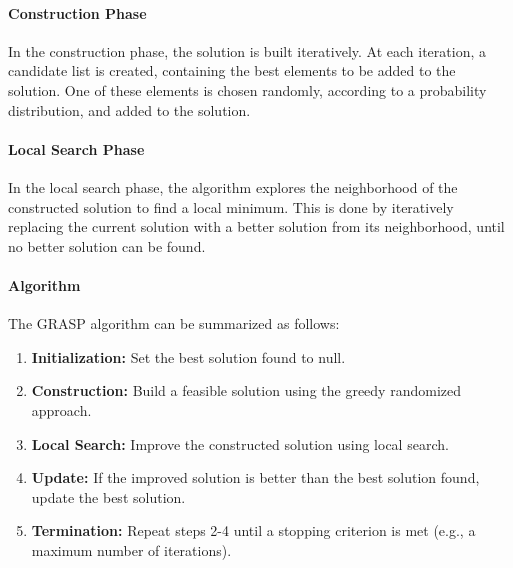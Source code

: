 \documentclass{article}
\begin{document}
\paragraph{Construction Phase}
In the construction phase, the solution is built iteratively. At each iteration, a candidate list is created,
containing the best elements to be added to the solution. One of these elements is chosen randomly, according
to a probability distribution, and added to the solution.

\paragraph{Local Search Phase}
In the local search phase, the algorithm explores the neighborhood of the constructed solution to find a local minimum.
This is done by iteratively replacing the current solution with a better solution from its neighborhood,
until no better solution can be found.

\paragraph{Algorithm}
The GRASP algorithm can be summarized as follows:
\begin{enumerate}
	\item \textbf{Initialization:} Set the best solution found to null.
	\item \textbf{Construction:} Build a feasible solution using the greedy randomized approach.
	\item \textbf{Local Search:} Improve the constructed solution using local search.
	\item \textbf{Update:} If the improved solution is better than the best solution found, update the best solution.
	\item \textbf{Termination:} Repeat steps 2-4 until a stopping criterion is met (e.g., a maximum number of iterations).
\end{enumerate}
\end{document}
